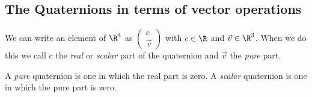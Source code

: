 \documentclass[oneside,12pt]{amsart}
\begin{document}
\subsection{The Quaternions in terms of vector operations}

We can write an element of $\R^4$ as
$\begin{pmatrix}
c\\
\vec{v}
\end{pmatrix}$ with $c\in \R$ and $\vec{v}\in\R^3$. When
we do this we call $c$ the \emph{real} or \emph{scalar}
part of the quaternion and $\vec{v}$ the \emph{pure} part. 

\begin{definition}
A \emph{pure} quaternion is one in which the real part is zero.
A \emph{scalar} quaternion is one in which the pure part is zero.
\end{definition}
\end{document}
